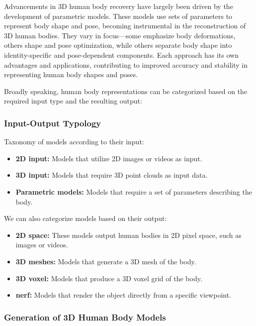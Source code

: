 Advancements in 3D human body recovery have largely been driven by the
development of parametric models. These models use sets of parameters to
represent body shape and pose, becoming instrumental in the reconstruction of
3D human bodies. They vary in focus—some emphasize body deformations, others
shape and pose optimization, while others separate body shape into
identity-specific and pose-dependent components. Each approach has its own
advantages and applications, contributing to improved accuracy and stability in
representing human body shapes and poses.

Broadly speaking, human body representations can be categorized based on the
required input type and the resulting output:

\subsubsection{Input-Output Typology}

Taxonomy of models according to their input:

\begin{itemize}
	\item \textbf{2D input:} Models that utilize 2D images or videos as input.
	\item \textbf{3D input:} Models that require 3D point clouds as input data.
	\item \textbf{Parametric models:} Models that require a set of parameters describing the body.
\end{itemize}

We can also categorize models based on their output:

\begin{itemize}
	\item \textbf{2D space:} These models output human bodies in 2D pixel space, such as images or videos.
	\item \textbf{3D meshes:} Models that generate a 3D mesh of the body.
	\item \textbf{3D voxel:} Models that produce a 3D voxel grid of the body.
	\item \textbf{\gls{nerf}:} Models that render the object directly from a specific viewpoint.
\end{itemize}

\subsubsection{Generation of 3D Human Body Models}

